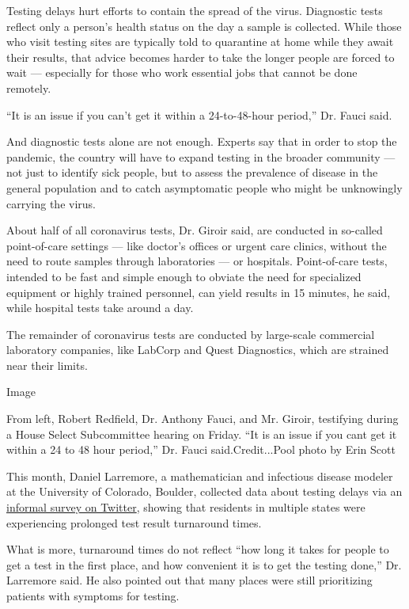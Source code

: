 Testing delays hurt efforts to contain the spread of the virus.
Diagnostic tests reflect only a person's health status on the day a
sample is collected. While those who visit testing sites are typically
told to quarantine at home while they await their results, that advice
becomes harder to take the longer people are forced to wait ---
especially for those who work essential jobs that cannot be done
remotely.

``It is an issue if you can't get it within a 24-to-48-hour period,''
Dr. Fauci said.

And diagnostic tests alone are not enough. Experts say that in order to
stop the pandemic, the country will have to expand testing in the
broader community --- not just to identify sick people, but to assess
the prevalence of disease in the general population and to catch
asymptomatic people who might be unknowingly carrying the virus.

About half of all coronavirus tests, Dr. Giroir said, are conducted in
so-called point-of-care settings --- like doctor's offices or urgent
care clinics, without the need to route samples through laboratories ---
or hospitals. Point-of-care tests, intended to be fast and simple enough
to obviate the need for specialized equipment or highly trained
personnel, can yield results in 15 minutes, he said, while hospital
tests take around a day.

The remainder of coronavirus tests are conducted by large-scale
commercial laboratory companies, like LabCorp and Quest Diagnostics,
which are strained near their limits.

Image

From left, Robert Redfield, Dr. Anthony Fauci, and Mr. Giroir,
testifying during a House Select Subcommittee hearing on Friday. ``It is
an issue if you cant get it within a 24 to 48 hour period,'' Dr. Fauci
said.Credit...Pool photo by Erin Scott

This month, Daniel Larremore, a mathematician and infectious disease
modeler at the University of Colorado, Boulder, collected data about
testing delays via an
\href{https://larremorelab.github.io/covid19testgroup}{informal survey
on Twitter}, showing that residents in multiple states were experiencing
prolonged test result turnaround times.

What is more, turnaround times do not reflect ``how long it takes for
people to get a test in the first place, and how convenient it is to get
the testing done,'' Dr. Larremore said. He also pointed out that many
places were still prioritizing patients with symptoms for testing.


